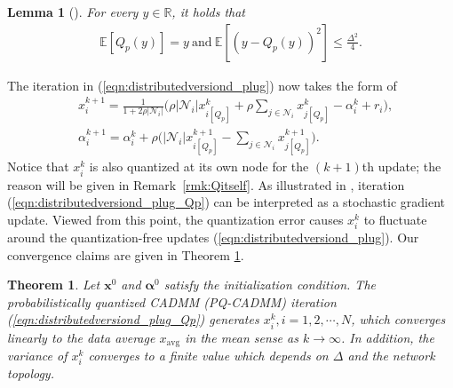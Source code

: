 \documentclass[journal]{IEEEtran}
\newtheorem{theorem}{Theorem}
\newtheorem{lemma}{Lemma}
\newcommand{\nn}{\nonumber}
\begin{document}
\begin{lemma}[{\cite[Lemma 2]{Xiao2005a}}]
\label{lem:QPproperty}
For every $y\in\mathbb{R}$, it holds that 
\begin{equation}
\begin{aligned}
\mathbb{E}\left[Q_p(y)\right]=y~\text{and}~\mathbb{E}\left[\left(y-Q_p(y)\right)^2\right]\leq\frac{\Delta^2}{4}.\nn
\end{aligned}
\end{equation}
\end{lemma}
The iteration in (\ref{eqn:distributedversiond_plug}) now takes the form of
\begin{equation}
\label{eqn:distributedversiond_plug_Qp}
\begin{aligned}
&x_i^{k+1}=\frac{1}{1+2\rho|\mathcal{N}_i|}\Bigg(\rho|\mathcal{N}_i|x_{i[Q_p]}^k+\rho\sum_{j\in\mathcal{N}_i} x_{j[Q_p]}^k-\alpha_i^k+r_i\Bigg),\\
&\alpha_i^{k+1}=\alpha_i^k+\rho\Bigg(|\mathcal{N}_i|x_{i[Q_p]}^{k+1}-\sum_{j\in\mathcal{N}_i} x_{j[Q_p]}^{k+1}\Bigg).
\end{aligned}
\end{equation} 
Notice that $x_i^k$ is also quantized at its own node for the $(k+1)$th update; the reason will be given in Remark~\ref{rmk:Qitself}. As illustrated in \cite{Zhu2009}, iteration (\ref{eqn:distributedversiond_plug_Qp}) can be interpreted as a stochastic gradient update. Viewed from this point, the quantization error causes $x_i^{k}$ to fluctuate around the quantization-free updates  (\ref{eqn:distributedversiond_plug}). Our convergence claims are given in Theorem \ref{thm:Qpresult}.
\begin{theorem}
\label{thm:Qpresult}
Let $\bm x^0$ and  $\bm\alpha^0$ satisfy the initialization condition. The probabilistically quantized CADMM (PQ-CADMM) iteration (\ref{eqn:distributedversiond_plug_Qp}) generates $x_i^k,i=1,2,\cdots,N$, which converges linearly to the data average $x_\text{avg}$ in the mean sense as $k\to\infty$. In addition, the variance of $x_i^k$ converges to a finite value which depends on $\Delta$ and the network topology.
\end{theorem}
\end{document}
